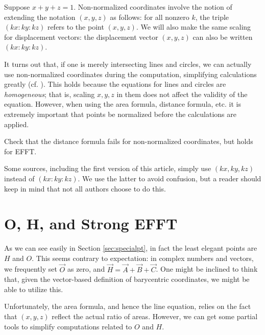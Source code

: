 Suppose $x+y+z=1$.  Non-normalized coordinates involve the notion of extending the notation $(x,y,z)$ as follows: for all nonzero $k$, the triple $(kx:ky:kz)$ refers to the point $(x,y,z)$.  We will also make the same scaling for displacement vectors: the displacement vector $(x,y,z)$ can also be written $(kx:ky:kz)$.

It turns out that, if one is merely intersecting lines and circles, we can actually use non-normalized coordinates during the computation, simplifying calculations greatly (cf. \cite{infinity}).  This holds because the equations for lines and circles are \textit{homogeneous}; that is, scaling $x,y,z$ in them does not affect the validity of the equation.  However, when using the area formula, distance formula, etc. it is extremely important that points be normalized before the calculations are applied.

\begin{exercise}
  Check that the distance formula fails for non-normalized coordinates, but holds for EFFT.
\end{exercise}

Some sources, including the first version of this article, simply use $(kx,ky,kz)$ instead of $(kx:ky:kz)$.  We use the latter to avoid confusion, but a reader should keep in mind that not all authors choose to do this.






\section{O, H, and Strong EFFT}
As we can see easily in Section \ref{sec:specialpt}, in fact the least elegant points are $H$ and $O$.  This seems contrary to expectation: in complex numbers and vectors, we frequently set $\vec O$ as zero, and $\vec H = \vec A + \vec B + \vec C$.  One might be inclined to think that, given the vector-based definition of barycentric coordinates, we might be able to utilize this.

Unfortunately, the area formula, and hence the line equation, relies on the fact that $(x,y,z)$ reflect the actual ratio of areas.  However, we can get some partial tools to simplify computations related to $O$ and $H$.

